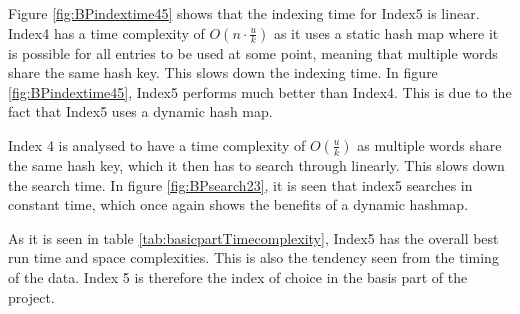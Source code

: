 Figure \ref{fig:BPindextime45} shows that the indexing time for Index5 is linear. Index4 has a time complexity of $O(n\cdot \frac{u}{k})$ as it uses a static hash map where it is possible for all entries to be used at some point, meaning that multiple words share the same hash key. This slows down the indexing time. 
In figure \ref{fig:BPindextime45}, Index5 performs much better than Index4. This is due to the fact that Index5 uses a dynamic hash map. 

 Index 4 is analysed to have a time complexity of $O(\frac{u}{k})$ as multiple words share the same hash key, which it then has to search through linearly. This slows down the search time. In figure \ref{fig:BPsearch23}, it is seen that index5 searches in constant time, which once again shows the benefits of a dynamic hashmap.

 As it is seen in table \ref{tab:basicpartTimecomplexity}, Index5 has the overall best run time and space complexities. This is also the tendency seen from the timing of the data. Index 5 is therefore the index of choice in the basis part of the project.  

